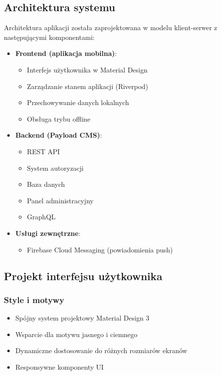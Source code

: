 \subsection{Architektura systemu}
Architektura aplikacji została zaprojektowana w modelu klient-serwer z następującymi komponentami:

\begin{itemize}
  \item \textbf{Frontend (aplikacja mobilna)}:
        \begin{itemize}
          \item Interfejs użytkownika w Material Design
          \item Zarządzanie stanem aplikacji (Riverpod)
          \item Przechowywanie danych lokalnych
          \item Obsługa trybu offline
        \end{itemize}
        
  \item \textbf{Backend (Payload CMS)}:
        \begin{itemize}
          \item REST API
          \item System autoryzacji
          \item Baza danych 
          \item Panel administracyjny
          \item GraphQL
        \end{itemize}
        
  \item \textbf{Usługi zewnętrzne}:
        \begin{itemize}
          \item Firebase Cloud Messaging (powiadomienia push)
        \end{itemize}
\end{itemize}

\subsection{Projekt interfejsu użytkownika}

\subsubsection{Style i motywy}
\begin{itemize}
  \item Spójny system projektowy Material Design 3
  \item Wsparcie dla motywu jasnego i ciemnego
  \item Dynamiczne dostosowanie do różnych rozmiarów ekranów
  \item Responsywne komponenty UI
\end{itemize}

